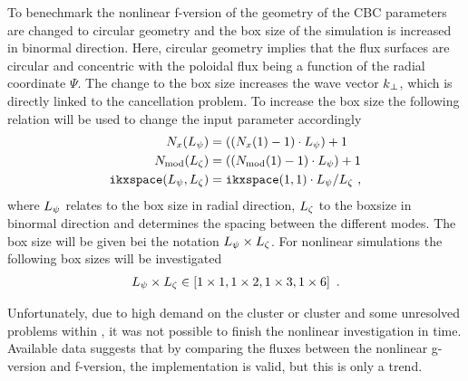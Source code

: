 To benechmark the nonlinear f-version of {\gkw} the geometry of the CBC parameters are changed to circular geometry and the box size of the simulation is increased in binormal direction. Here, circular geometry implies that the flux surfaces are circular and concentric with the poloidal flux being a function of the radial coordinate $\Psi$. \cite{GKWManual} The change to the box size increases the wave vector $k_\perp$, which is directly linked to the cancellation problem. To increase the box size the following relation will be used to change the input parameter accordingly
\begin{gather}
    \begin{aligned}
        N_x(L_\psi) &= ((N_x(1) - 1) \cdot L_\psi) + 1 \\
        N_\mathrm{mod}(L_\zeta) &= ((N_\mathrm{mod}(1) - 1) \cdot L_\psi) + 1 \\
        \mathtt{ikxspace}(L_\psi,L_\zeta) &= \mathtt{ikxspace}(1,1) \cdot L_\psi/L_\zeta~,
    \end{aligned}
    \label{eq:boxsize}
\end{gather}
where $L_\psi$ relates to the box size in radial direction, $L_\zeta$ to the boxsize in binormal direction and  determines the spacing between the different modes. The box size will be given bei the notation $L_\psi \times L_\zeta$. For nonlinear simulations the following box sizes will be investigated
\begin{gather*}
    L_\psi \times L_\zeta \in \left[ 1\times 1, 1 \times 2, 1\times 3, 1 \times 6\right] ~.
\end{gather*}

Unfortunately, due to high demand on the  cluster or  cluster and some unresolved problems within {\gkw}, it was not possible to finish the nonlinear investigation in time. Available data suggests that by comparing the fluxes between the nonlinear g-version and f-version, the implementation is valid, but this is only a trend. 